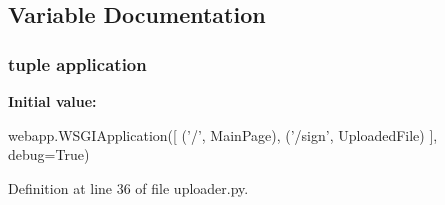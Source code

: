 \subsection{Variable Documentation}
\hypertarget{namespaceuploader_a84bbed69751228281d405bfe08a3cc1d}{
\subsubsection[{application}]{\setlength{\rightskip}{0pt plus 5cm}tuple {\bf application}}}
\label{namespaceuploader_a84bbed69751228281d405bfe08a3cc1d}
{\bfseries Initial value:}
\begin{DoxyCode}
webapp.WSGIApplication([
    ('/', MainPage),
    ('/sign', UploadedFile)
], debug=True)
\end{DoxyCode}


Definition at line 36 of file uploader.py.

